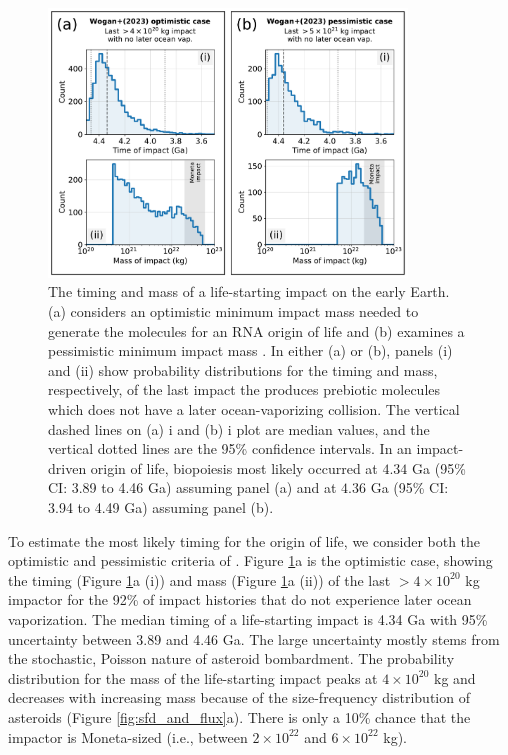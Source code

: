 \documentclass[manuscript]{aastex63}
\begin{document}
\begin{figure}
  \centering
  \includegraphics[width=0.85\textwidth]{figures/timing_and_mass.pdf}
  \caption{The timing and mass of a life-starting impact on the early Earth. (a) considers an optimistic minimum impact mass needed to generate the molecules for an RNA origin of life and (b) examines a pessimistic minimum impact mass \citep{Wogan_2023}. In either (a) or (b), panels (i) and (ii) show probability distributions for the timing and mass, respectively, of the last impact the produces prebiotic molecules which does not have a later ocean-vaporizing collision. The vertical dashed lines on (a) i and (b) i plot are median values, and the vertical dotted lines are the 95\% confidence intervals. In an impact-driven origin of life, biopoiesis most likely occurred at $4.34$ Ga (95\% CI: 3.89 to 4.46 Ga) assuming panel (a) and at $4.36$ Ga (95\% CI: 3.94 to 4.49 Ga) assuming panel (b).}
  \label{fig:time_and_mass}
\end{figure}

To estimate the most likely timing for the origin of life, we consider both the optimistic and pessimistic criteria of \citet{Wogan_2023}. Figure \ref{fig:time_and_mass}a is the optimistic case, showing the timing (Figure \ref{fig:time_and_mass}a (i)) and mass (Figure \ref{fig:time_and_mass}a (ii)) of the last $> 4 \times 10^{20}$ kg impactor for the 92\% of impact histories that do not experience later ocean vaporization. The median timing of a life-starting impact is 4.34 Ga with 95\% uncertainty between 3.89 and 4.46 Ga. The large uncertainty mostly stems from the stochastic, Poisson nature of asteroid bombardment. The probability distribution for the mass of the life-starting impact peaks at $4 \times 10^{20}$ kg and decreases with increasing mass because of the size-frequency distribution of asteroids (Figure \ref{fig:sfd_and_flux}a). There is only a 10\% chance that the impactor is Moneta-sized (i.e., between $2 \times 10^{22}$ and $6 \times 10^{22}$ kg).
\end{document}
